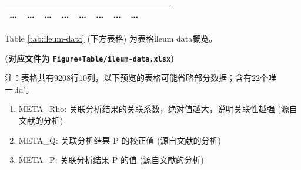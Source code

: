 \documentclass[
]{article}
\providecommand{\tightlist}{%
  \setlength{\itemsep}{0pt}\setlength{\parskip}{0pt}}
\begin{document}
\begin{longtable}[]{@{}lllllllllll@{}}
\begin{minipage}[t]{0.09\columnwidth}
\ldots{}\strut
\end{minipage} & \begin{minipage}[t]{0.07\columnwidth}\raggedright
\ldots{}\strut
\end{minipage} & \begin{minipage}[t]{0.07\columnwidth}\raggedright
\ldots{}\strut
\end{minipage} & \begin{minipage}[t]{0.09\columnwidth}\raggedright
\ldots{}\strut
\end{minipage} & \begin{minipage}[t]{0.07\columnwidth}\raggedright
\ldots{}\strut
\end{minipage} & \begin{minipage}[t]{0.07\columnwidth}\raggedright
\ldots{}\strut
\end{minipage} & \begin{minipage}[t]{0.07\columnwidth}\raggedright
\ldots{}\strut
\end{minipage} & \begin{minipage}[t]{0.03\columnwidth}\raggedright
\ldots{}\strut
\end{minipage}\tabularnewline
\bottomrule
\end{longtable}

\begin{center}\vspace{1.5cm}\end{center}

\begin{center}\vspace{1.5cm}\end{center}

Table \ref{tab:ileum-data} (下方表格) 为表格ileum data概览。

\textbf{(对应文件为 \texttt{Figure+Table/ileum-data.xlsx})}

\begin{center}\begin{tcolorbox}[colback=gray!10, colframe=gray!50, width=0.9\linewidth, arc=1mm, boxrule=0.5pt]注：表格共有9208行10列，以下预览的表格可能省略部分数据；含有22个唯一`.id'。
\end{tcolorbox}
\end{center}
\begin{center}\begin{tcolorbox}[colback=gray!10, colframe=gray!50, width=0.9\linewidth, arc=1mm, boxrule=0.5pt]\begin{enumerate}\tightlist
\item META\_Rho:  关联分析结果的关联系数，绝对值越大，说明关联性越强 (源自文献的分析)
\item META\_Q:  关联分析结果 P 的校正值 (源自文献的分析)
\item META\_P:  关联分析结果 P 的值 (源自文献的分析)
\end{enumerate}\end{tcolorbox}
\end{center}
\end{document}
